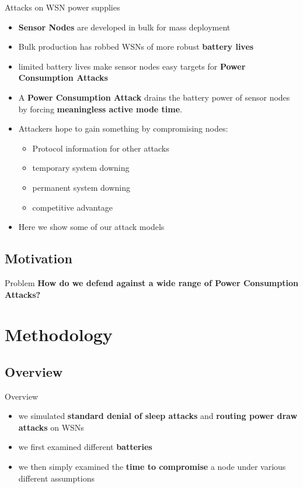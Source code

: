 \documentclass{beamer}
\begin{document}
\begin{frame}{Attacks on WSN power supplies}
\begin{itemize}
	\item \textbf{Sensor Nodes} are developed in bulk for mass deployment 
	\item Bulk production has robbed WSNs of more robust \textbf{battery lives}
	\item limited battery lives make sensor nodes easy targets for \textbf{Power Consumption Attacks}
	\item A \textbf{Power Consumption Attack} drains the battery power of sensor nodes by forcing \textbf{meaningless active mode time}.
	\item Attackers hope to gain something by compromising nodes:
	\begin{itemize}
		\item Protocol information for other attacks
		\item temporary system downing
		\item permanent system downing
		\item competitive advantage
	\end{itemize}
	\item Here we show some of our attack models
\end{itemize}	
\end{frame}


\subsection{Motivation}

\begin{frame}{Problem}
\centering
\textbf{\huge{How do we defend against a wide range of Power Consumption Attacks?}}	
\end{frame}

\section{Methodology}

\subsection{Overview}
\begin{frame}{Overview}
\begin{itemize}
	\item we simulated \textbf{standard denial of sleep attacks} and \textbf{routing power draw attacks} on WSNs
	\item we first examined different \textbf{batteries}
	\item we then simply examined the \textbf{time to compromise} a node under various different assumptions
\end{itemize}
\end{frame}
\end{document}
